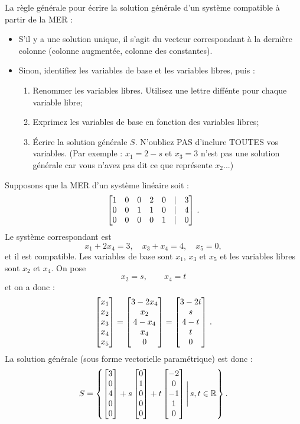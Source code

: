 La règle générale pour écrire la solution générale d'un système compatible à partir de la MER :
\begin{itemize}
\item S'il y a une solution unique, il s'agit du vecteur correspondant \`a la derni\`ere colonne (colonne augmentée, colonne des constantes).
\item Sinon, identifiez les variables de base et les variables libres, puis :
\begin{enumerate}
\item Renommer les variables libres. Utilisez une lettre diff\'ente pour chaque variable libre;
\item Exprimez les variables de base en fonction des variables libres;
\item \'Ecrire la solution générale $S$. N'oubliez PAS d'inclure TOUTES vos variables.  (Par exemple : $x_1=2-s$ et $x_3 = 3$ n'est pas une solution générale car vous n'avez pas dit ce que représente $x_2$...)
\end{enumerate}
\end{itemize}

\begin{myexample} Supposons que la MER d'un syst\`eme lin\'eaire soit : 
$$
\left[ \begin{matrix} 1 & 0 & 0 & 2 & 0 &|& 3\\
     0 & 0 & 1 & 1 & 0 &|& 4\\
     0 & 0 & 0 & 0 & 1 &|& 0 \end{matrix} \right]\,.
$$
Le syst\`eme correspondant est 
$$
x_1 + 2x_4 = 3, \quad x_3 + x_4 = 4, \quad x_5=0,
$$
et il est compatible. Les variables de base sont $x_1$, $x_3$ et $x_5$
et les variables libres sont $x_2$ et $x_4$.  On pose 
$$
x_2 = s, \qquad x_4 = t
$$
et on a donc :
$$
\left[ \begin{matrix} x_1\\x_2\\x_3\\x_4\\x_5 \end{matrix} \right] = \left[ \begin{matrix} 3-2x_4\\ x_2 \\ 4-x_4\\ x_4 \\ 0 \end{matrix} \right] = \left[ \begin{matrix} 3-2t\\s\\4-t\\t\\0 \end{matrix} \right]\,.
$$
La solution générale (sous forme vectorielle paramétrique) est donc :
$$
S=\left\{ \left[ \begin{matrix} 3\\0\\4\\0\\0 \end{matrix} \right]+s\left[ \begin{matrix} 0\\1\\0\\0\\0 \end{matrix} \right] + t\left[ \begin{matrix} -2\\0\\-1\\1\\0 \end{matrix} \right] \Bigg|\, s,t\in\mathbb{R}\right\}.
$$
\end{myexample}

